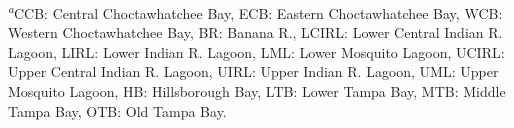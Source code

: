 \documentclass[letterpaper,12pt,oneside]{article}\usepackage[]{graphicx}\usepackage[]{color}
\begin{document}
\begin{table}[!tbp]
\textsuperscript{\textit{a}}\footnotesize CCB: Central Choctawhatchee Bay, ECB: Eastern Choctawhatchee Bay, WCB: Western Choctawhatchee Bay, BR: Banana R., LCIRL: Lower Central Indian R. Lagoon, LIRL: Lower Indian R. Lagoon, LML: Lower Mosquito Lagoon, UCIRL: Upper Central Indian R. Lagoon, UIRL: Upper Indian R. Lagoon, UML: Upper Mosquito Lagoon, HB: Hillsborough Bay, LTB: Lower Tampa Bay, MTB: Middle Tampa Bay, OTB: Old Tampa Bay.\end{table}


\clearpage




\begin{figure}
\centering
{}


\end{figure}
\end{document}
